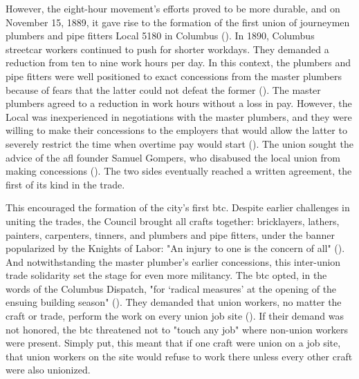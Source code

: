 \documentclass[12pt]{article}
\begin{document}
However, the eight-hour movement’s efforts proved to be more durable, and on November 15, 1889, it gave rise to the formation of the first union of journeymen plumbers and pipe fitters Local 5180 in Columbus (\cite[45]{schneirovPrideSolidarityHistory1993}). In 1890, Columbus streetcar workers continued to push for shorter workdays. They demanded a reduction from ten to nine work hours per day. In this context, the plumbers and pipe fitters were well positioned to exact concessions from the master plumbers because of fears that the latter could not defeat the former (\citeyear[45–46]{schneirovPrideSolidarityHistory1993}). The master plumbers agreed to a reduction in work hours without a loss in pay. However, the Local was inexperienced in negotiations with the master plumbers, and they were willing to make their concessions to the employers that would allow the latter to severely restrict the time when overtime pay would start (\citeyear[46–47]{schneirovPrideSolidarityHistory1993}). The union sought the advice of the \acrshort{afl} founder Samuel Gompers, who disabused the local union from making concessions (\citeyear[46–47]{schneirovPrideSolidarityHistory1993}). The two sides eventually reached a written agreement, the first of its kind in the trade. 

This encouraged the formation of the city’s first \acrfull{btc}. Despite earlier challenges in uniting the trades, the Council brought all crafts together: bricklayers, lathers, painters, carpenters, tinners, and plumbers and pipe fitters, under the banner popularized by the Knights of Labor: "An injury to one is the concern of all" (\cite[47]{schneirovPrideSolidarityHistory1993}). And notwithstanding the master plumber’s earlier concessions, this inter-union trade solidarity set the stage for even more militancy. The \acrshort{btc} opted, in the words of the Columbus Dispatch, "for ‘radical measures’ at the opening of the ensuing building season" (\citeyear[47]{schneirovPrideSolidarityHistory1993}). They demanded that union workers, no matter the craft or trade, perform the work on every union job site (\citeyear[47]{schneirovPrideSolidarityHistory1993}). If their demand was not honored, the \acrshort{btc} threatened not to "touch any job" where non-union workers were present. Simply put, this meant that if one craft were union on a job site, that union workers on the site would refuse to work there unless every other craft were also unionized.
\end{document}
